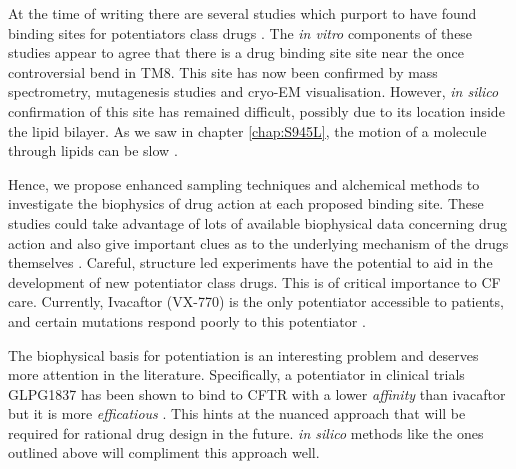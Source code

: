 At the time of writing there are several studies which purport to have found binding sites for potentiators class drugs \cite{yeh2019, laselva2021a, liu2019, baatallah2021}. The \textit {in vitro} components of these studies appear to agree that there is a drug binding site site near the once controversial bend in TM8. This site has now been confirmed by mass spectrometry, mutagenesis studies and cryo-EM visualisation. However, \textit{in silico} confirmation of this site has remained difficult, possibly due to its location inside the lipid bilayer. As we saw in chapter \ref{chap:S945L}, the motion of a molecule through lipids can be slow \cite{laselva2021a}. 

Hence, we propose enhanced sampling techniques and alchemical methods to investigate the biophysics of drug action at each proposed binding site. These studies could take advantage of lots of available biophysical data concerning drug action and also give important clues as to the underlying mechanism of the drugs themselves \cite{yeh2017, yeh2019,csanady2019}. Careful, structure led experiments have the potential to aid in the development of new potentiator class drugs. This is of critical importance to CF care. Currently, Ivacaftor (VX-770) is the only potentiator accessible to patients, and certain mutations respond poorly to this potentiator \cite{phuan2018, vangoor2014}. 

The biophysical basis for potentiation is an interesting problem and deserves more attention in the literature. Specifically, a potentiator in clinical trials GLPG1837 has been shown to bind to CFTR with a lower \textit{affinity} than ivacaftor but it is more \textit{efficatious} \cite{yeh2019, yeh2017,vanderplas2018}. This hints at the nuanced approach that will be required for rational drug design in the future. \textit{in silico} methods like the ones outlined above will compliment this approach well.

